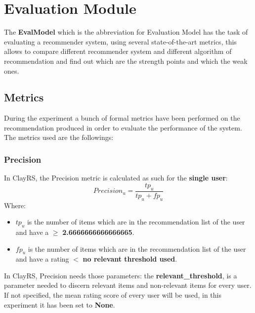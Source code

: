 \documentclass[11pt]{article}
\begin{document}





\section{Evaluation Module}\label{sec:eva-module}
The \textbf{EvalModel} which is the abbreviation for Evaluation Model has the task of evaluating a recommender system,
using several state-of-the-art metrics, this allows to compare different recommender system and different algorithm of
recommendation and find out which are the strength points and which the weak ones.

\subsection{Metrics}\label{subsec:metrics}
During the experiment a bunch of formal metrics have been performed on the recommendation produced in order to evaluate
the performance of the system.
The metrics used are the followings:
\hfill\break
\hfill\break

\subsubsection{Precision}\label{subsubsec:precision}
In ClayRS, the Precision metric is calculated as such for the \textbf{single user}:
\hfill\break
\hfill\break
    \[
         Precision_u = \frac{tp_u}{tp_u + fp_u}
    \]
\hfill\break
\hfill\break
    Where:
\begin{itemize}
    \item $tp_u$ is the number of items which are in the recommendation list of the user and have a
       $\geq$         \textbf{2.6666666666666665}.
            \item $fp_u$ is the number of items which are in the recommendation list of the user and have a
      rating $<$         \textbf{no relevant threshold used}.
        \end{itemize}
\hfill\break
\hfill\break
In ClayRS, Precision needs those parameters:
the \textbf{relevant\_threshold}, is a parameter needed to discern relevant items and non-relevant items for every user.
If not specified, the mean rating score of every user will be used, in this experiment it has been set to
\textbf{None}.
\hfill\break
\hfill\break
\end{document}
